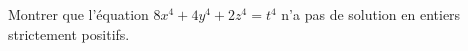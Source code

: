 Montrer que l'équation $8x^4 + 4y^4 + 2z^4 = t^4$ n'a pas de solution en entiers strictement positifs.
